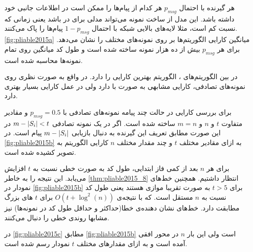 هر گیرنده با احتمال
$p_{msg}$
هر کدام از پیام‌ها را ممکن است در اطلاعات جانبی خود داشته باشد. این مدل از ساخت نمونه می‌تواند مدلی برای
در
باشد یعنی زمانی که نسبت
کم است، مثلا لایه‌های بالایی شبکه با احتمال
$1 - p_{msg}$
پیام‌ها را پاک می‌کنند.
\autoref{fig:pliable2015a}
میانگین کارایی الگوریتم‌ها بر روی نمونه‌های مختلف را نشان می‌دهد. برای هر
$p_{msg}$
بیش از ده هزار نمونه ساخته شده است و طول کد میانگین روی تمام نمونه‌ها محاسبه شده است.

در بین الگوریتم‌های
\picod، الگوریتم
بهترین کارایی را دارد. در واقع
به صورت نظری روی نمونه‌های تصادفی، کارایی مشابهی به صورت
با
دارد ولی در عمل کارایی بسیار بهتری دارد.

برای بررسی کارایی
در حالت چند پیامه
نمونه‌های تصادفی با
$p_{msg} = 0.5$
و مقادیر متفاوت
$t$
و
$n$
و
$m = n$
ساخته شده است. اگر در یک نمونه‌ تصادفی
$m - \left|{S_i}\right| < t$
در این صورت مطابق تعریف این گیرنده به دنبال بازیابی
$m - \left|{S_i}\right|$
پیام است. در
\autoref{fig:pliable2015b}
به ازای مقادیر مختلف
$t$
و چند مقدار مختلف
$n$
کارایی الگوریتم به تصویر کشیده شده است.

برای هر
$n$
بعد از کمی فاز ابتدایی، طول کد به صورت خطی نسبت به
$t$
افزایش می‌یابد. این نتیجه را به خاطر
\autoref{thm:pliable2015_8}
انتظار داشتیم. همچنین خط‌های نمودار در
\autoref{fig:pliable2015b}
برای
$t > 5$
به صورت تقریبا موازی هستند یعنی طول کد نسبت به
$n$
مستقل است. که با نتیجه‌ی
$O(t + \log^2(n))$
برای
$t$
های بزرگ مطابقت دارد. خط‌های نشان دهنده‌ی خطا(حداکثر و حداقل طول کد در نمونه‌ها) نیز مشابها روندی خطی را دنبال می‌کنند.

در
\autoref{fig:pliable2015c}
مطابق
\autoref{fig:pliable2015b}
است ولی این بار
$n$
در محور افقی آمده است و به ازای مقدارهای مختلف
$t$
نمودار رسم شده است.

